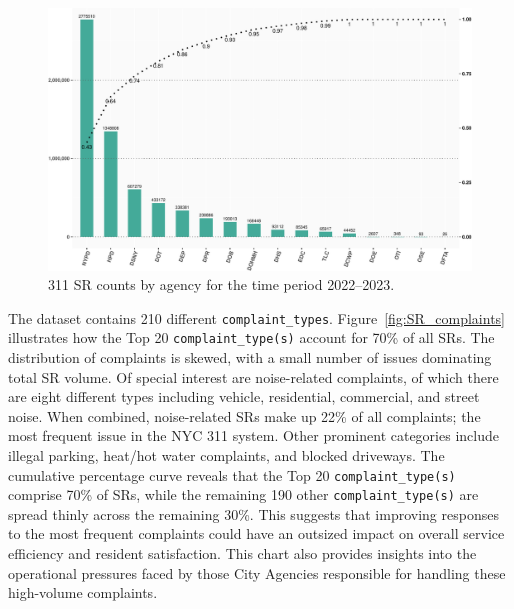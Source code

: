 \documentclass[linenumber]{jdsart}
\begin{document}
\begin{figure}[tbp]
	\centering
	\includegraphics[width = \textwidth]{SRs_by_Agency-crop.pdf}
  	\caption{311 SR counts by agency for the time period 2022--2023.}
	\label{fig:SRcountbyAgency}
\end{figure}

The dataset contains 210 different \texttt{complaint\_types}. 
Figure~\ref{fig:SR_complaints} illustrates how the Top 20 
\texttt{complaint\_type(s)} account for 70\% 
of all SRs. The distribution of complaints is skewed, 
with a small number of issues dominating total SR volume. 
Of special interest are noise-related complaints, of 
which there are eight different types including vehicle, 
residential, commercial, and street noise. When 
combined, noise-related SRs make up 22\% of all 
complaints; the most frequent issue in the NYC 311 system. 
Other prominent categories include illegal parking, heat/hot water 
complaints, and blocked driveways. The cumulative percentage curve 
reveals that the Top 20 \texttt{complaint\_type(s)} comprise 70\% of SRs,
while the remaining 190 other \texttt{complaint\_type(s)}  are spread thinly 
across the remaining 30\%. This suggests that improving 
responses to the most frequent complaints could have an 
outsized impact on overall service efficiency and resident 
satisfaction. This chart also provides insights into the 
operational pressures faced by those City Agencies 
responsible for handling these high-volume complaints.
\end{document}
